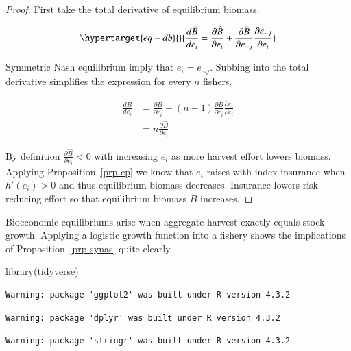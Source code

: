 \documentclass[
  super,
  preprint,
  3p]{elsarticle}
\newenvironment{Shaded}{\begin{snugshade}}{\end{snugshade}}
\newcommand{\FunctionTok}[1]{\textcolor[rgb]{0.28,0.35,0.67}{#1}}
\newcommand{\NormalTok}[1]{\textcolor[rgb]{0.00,0.23,0.31}{#1}}
\theoremstyle{plain}
\theoremstyle{plain}
\theoremstyle{remark}
\begin{document}
\begin{proof}

First take the total derivative of equilibrium biomass.

\begin{equation}\protect\hypertarget{eq-db}{}{
\frac{d \hat{B}}{d e_i}=
\frac{\partial \hat{B}}{\partial e_i}+\frac{\partial \hat{B}}{\partial e_{\sim j}}\frac{\partial e_{\sim j}}{\partial e_i}
}\label{eq-db}\end{equation}

Symmetric Nash equilibrium imply that \(e_i=e_{\sim j}\). Subbing into
the total derivative simplifies the expression for every \(n\) fishers.

\[
\begin{aligned}
\frac{d \hat{B}}{d e_i}&=
\frac{\partial \hat{B}}{\partial e_i}+(n-1)\frac{\partial \hat{B}}{\partial e_i}\frac{\partial e_i}{\partial e_i}\\
&=n\frac{\partial \hat{B}}{\partial e_i}
\end{aligned}
\]

By definition \(\frac{\partial \hat{B}}{\partial e_i}<0\) with
increasing \(e_i\) as more harvest effort lowers biomass. Applying
Proposition~\ref{prp-cp} we know that \(e_i\) raises with index
insurance when \(h'(e_i)>0\) and thus equilibrium biomass decreases.
Insurance lowers risk reducing effort so that equilibrium biomass
\(\hat{B}\) increases.

\end{proof}

Bioeconomic equilibriums arise when aggregate harvest exactly equals
stock growth. Applying a logistic growth function into a fishery shows
the implications of Proposition~\ref{prp-synas} quite clearly.

\begin{Shaded}
\begin{Highlighting}[]
\FunctionTok{library}\NormalTok{(tidyverse)}
\end{Highlighting}
\end{Shaded}

\begin{verbatim}
Warning: package 'ggplot2' was built under R version 4.3.2
\end{verbatim}

\begin{verbatim}
Warning: package 'dplyr' was built under R version 4.3.2
\end{verbatim}

\begin{verbatim}
Warning: package 'stringr' was built under R version 4.3.2
\end{verbatim}
\end{document}
